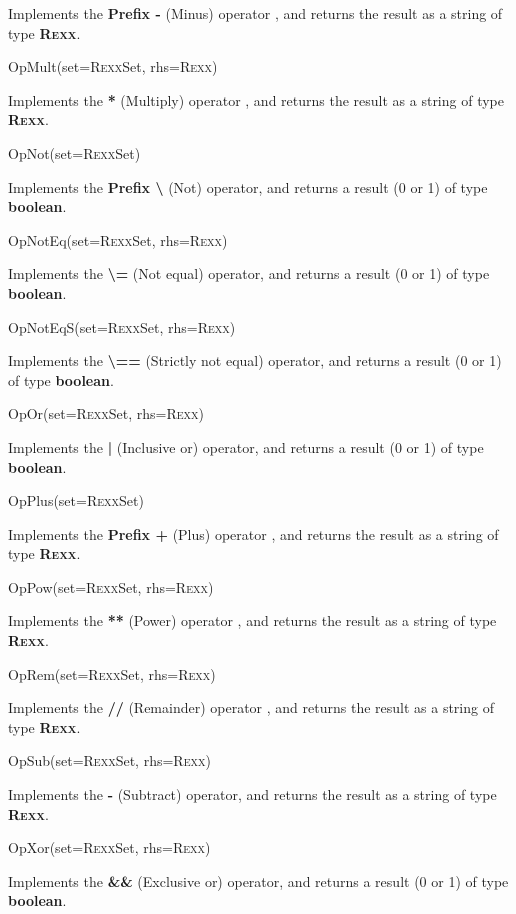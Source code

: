 \begin{description}
Implements the \nr{} \textbf{\textbf{Prefix -}} (Minus) operator
, and returns the result as a string of type \textbf{R\textsc{exx}}.
\item{OpMult(set=R\textsc{exx}Set, rhs=R\textsc{exx})}

Implements the \nr{} \textbf{\textbf{*}} (Multiply) operator
, and returns the result as a string of type \textbf{R\textsc{exx}}.
\item{OpNot(set=R\textsc{exx}Set)}

Implements the \nr{} \textbf{\textbf{Prefix \textbackslash }} (Not)
operator, and returns a result (0 or 1) of type \textbf{boolean}.
\item{OpNotEq(set=R\textsc{exx}Set, rhs=R\textsc{exx})}

Implements the \nr{} \textbf{\textbf{\textbackslash =}} (Not equal)
operator, and returns a result (0 or 1) of type \textbf{boolean}.
\item{OpNotEqS(set=R\textsc{exx}Set, rhs=R\textsc{exx})}

Implements the \nr{} \textbf{\textbf{\textbackslash ==}} (Strictly not
equal) operator, and returns a result (0 or 1) of
type \textbf{boolean}.
\item{OpOr(set=R\textsc{exx}Set, rhs=R\textsc{exx})}

Implements the \nr{} \textbf{\textbf{|}} (Inclusive or)
operator, and returns a result (0 or 1) of type \textbf{boolean}.
\item{OpPlus(set=R\textsc{exx}Set)}

Implements the \nr{} \textbf{\textbf{Prefix +}} (Plus) operator
, and returns the result as a string of type \textbf{R\textsc{exx}}.
\item{OpPow(set=R\textsc{exx}Set, rhs=R\textsc{exx})}

Implements the \nr{} \textbf{\textbf{**}} (Power) operator
, and returns the result as a string of type \textbf{R\textsc{exx}}.
\item{OpRem(set=R\textsc{exx}Set, rhs=R\textsc{exx})}

Implements the \nr{} \textbf{\textbf{//}} (Remainder) operator
, and returns the result as a string of type \textbf{R\textsc{exx}}.
\item{OpSub(set=R\textsc{exx}Set, rhs=R\textsc{exx})}

Implements the \nr{} \textbf{\textbf{-}} (Subtract) operator,
and returns the result as a string of type \textbf{R\textsc{exx}}.
\item{OpXor(set=R\textsc{exx}Set, rhs=R\textsc{exx})}

Implements the \nr{} \textbf{\textbf{\&\&}} (Exclusive or)
operator, and returns a result (0 or 1) of
type \textbf{boolean}.
\end{description}
